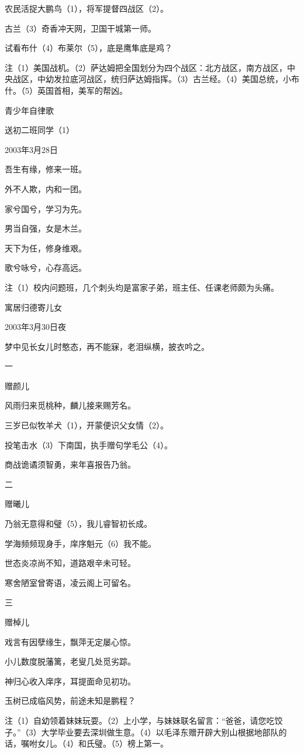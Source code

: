 \documentclass[../../dazhuan.tex]{subfiles}
\begin{document}
农民活捉大鹏鸟（1），将军提督四战区（2）。

古兰（3）奇香冲天网，卫国干城第一师。

试看布什（4）布莱尔（5），底是鹰隼底是鸡？

注（1）美国战机。（2）萨达姆把全国划分为四个战区：北方战区，南方战区，中央战区，中幼发拉底河战区，统归萨达姆指挥。（3）古兰经。（4）美国总统，小布什。（5）英国首相，美军的帮凶。



青少年自律歌

送初二班同学（1）

2003年3月28日

吾生有缘，修来一班。

外不人欺，内和一团。

家兮国兮，学习为先。

男当自强，女是木兰。

天下为任，修身维艰。

歌兮咏兮，心存高远。

注（1）校内问题班，几个刺头均是富家子弟，班主任、任课老师颇为头痛。



寓居归德寄儿女

2003年3月30日夜

梦中见长女儿时憨态，再不能寐，老泪纵横，披衣吟之。

一

赠颜儿

风雨归来觅桃种，麟儿接来赐芳名。

三岁已似牧羊犬（1），开蒙便识父女情（2）。

投笔击水（3）下南国，执手赠句学毛公（4）。

商战诡谲须智勇，来年喜报告乃翁。

二

赠曦儿

乃翁无意得和璧（5），我儿睿智初长成。

学海频频现身手，庠序魁元（6）我不能。

世态炎凉尚不知，道路艰辛未可轻。

寒舍陋室曾寄语，凌云阁上可留名。

三

赠棹儿

戏言有因孽缘生，飘萍无定屡心惊。

小儿数度脱藩篱，老叟几处觅劣踪。

神归心收入庠序，耳提面命见初功。

玉树已成临风势，前途未知是鹏程？

注（1）自幼领着妹妹玩耍。（2）上小学，与妹妹联名留言：“爸爸，请您吃饺子。”（3）大学毕业要去深圳做生意。（4）以毛泽东赠开辟大别山根据地部队的话，嘱咐女儿。（4）和氏璧。（5）榜上第一。
\end{document}
